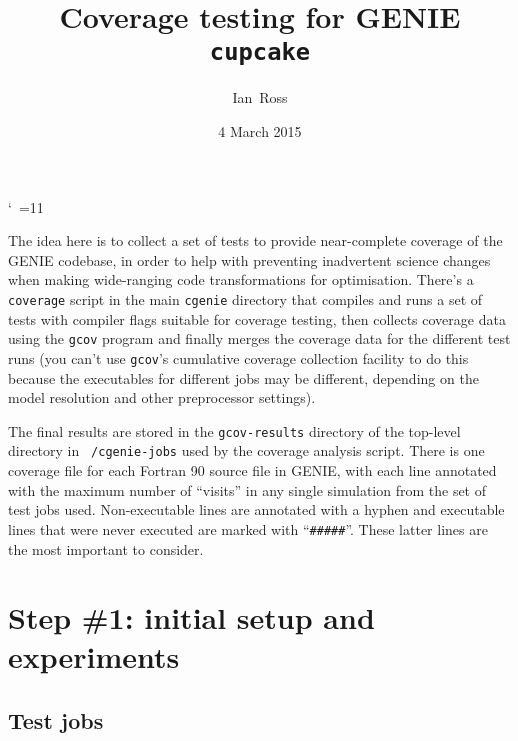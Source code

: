 \documentclass[a4paper,10pt,article]{memoir}
\title{Coverage testing for GENIE \texttt{cupcake}}
\author{Ian~Ross}
\date{4 March 2015}
\begin{document}
\catcode`~=11    %

\maketitle

The idea here is to collect a set of tests to provide near-complete
coverage of the GENIE codebase, in order to help with preventing
inadvertent science changes when making wide-ranging code
transformations for optimisation.  There's a \texttt{coverage} script
in the main \texttt{cgenie} directory that compiles and runs a set of
tests with compiler flags suitable for coverage testing, then collects
coverage data using the \texttt{gcov} program and finally merges the
coverage data for the different test runs (you can't use
\texttt{gcov}'s cumulative coverage collection facility to do this
because the executables for different jobs may be different, depending
on the model resolution and other preprocessor settings).

The final results are stored in the \texttt{gcov-results} directory of
the top-level directory in \texttt{~/cgenie-jobs} used by the coverage
analysis script.  There is one coverage file for each Fortran 90
source file in GENIE, with each line annotated with the maximum number
of ``visits'' in any single simulation from the set of test jobs used.
Non-executable lines are annotated with a hyphen and executable lines
that were never executed are marked with ``\texttt{\#\#\#\#\#}''.
These latter lines are the most important to consider.

\chapter{Step \#1: initial setup and experiments}

\section{Test jobs}
\end{document}
